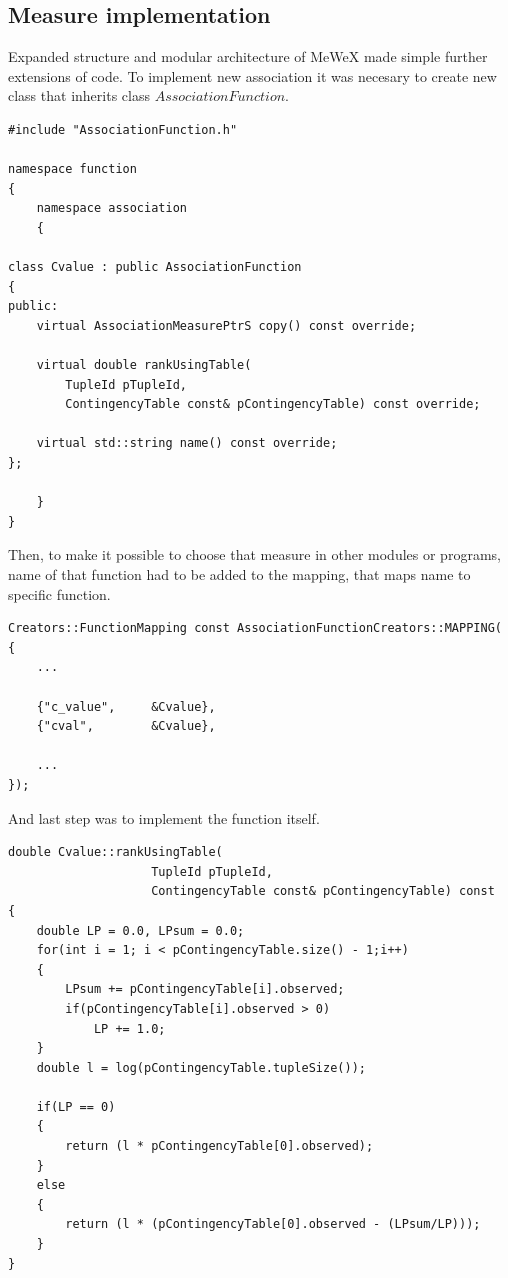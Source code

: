\subsection{Measure implementation}
Expanded structure and modular architecture of MeWeX made simple further extensions of code. To implement new association 
it was necesary to create new class that inherits class \(AssociationFunction\).
\begin{lstlisting}[float,floatplacement=H]
#include "AssociationFunction.h"

namespace function
{
    namespace association
    {

class Cvalue : public AssociationFunction
{
public:
    virtual AssociationMeasurePtrS copy() const override;

    virtual double rankUsingTable(
        TupleId pTupleId,
        ContingencyTable const& pContingencyTable) const override;

    virtual std::string	name() const override;
};

    }
}
\end{lstlisting}
Then, to make it possible to choose that measure in other modules or programs, name of that function had to be added to the mapping,
that maps name to specific function.
\begin{lstlisting}[float,floatplacement=H]
Creators::FunctionMapping const AssociationFunctionCreators::MAPPING(
{
    ...

    {"c_value",     &Cvalue},
    {"cval",        &Cvalue},

    ...
});
\end{lstlisting}
And last step was to implement the function itself.
\begin{lstlisting}[float,floatplacement=H]
double Cvalue::rankUsingTable(
                    TupleId pTupleId, 
                    ContingencyTable const& pContingencyTable) const
{
    double LP = 0.0, LPsum = 0.0;
    for(int i = 1; i < pContingencyTable.size() - 1;i++)
    {
        LPsum += pContingencyTable[i].observed;
        if(pContingencyTable[i].observed > 0)
            LP += 1.0;
    }
    double l = log(pContingencyTable.tupleSize());

    if(LP == 0)
    {
        return (l * pContingencyTable[0].observed);
    }
    else
    {
        return (l * (pContingencyTable[0].observed - (LPsum/LP)));
    }
}
\end{lstlisting}

